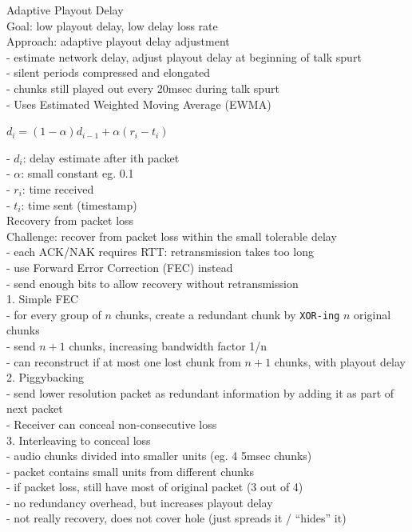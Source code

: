 \documentclass[10pt, a4paper]{article}
\newcommand{\blue}[1]{{\color{MidnightBlue}#1}}
\newcommand{\red}[1]{{\color{red}#1}}
\newcommand{\green}[1]{{\color{ForestGreen}#1}}
\newcommand{\tab}[0]{\hspace*{2mm}}
\begin{document}
\begin{multicols*}{3}
		Adaptive Playout Delay\\
		\red{Goal}: low playout delay, low delay loss rate\\
		\green{Approach}: adaptive playout delay adjustment\\
		\tab - estimate network delay, adjust playout delay at beginning of talk spurt\\
		\tab - silent periods compressed and elongated\\
		\tab - chunks still played out every 20msec during talk spurt\\
		- Uses Estimated Weighted Moving Average (EWMA)\\
		\centerline{$d_{i} = (1-\alpha)d_{i - 1} + \alpha(r_{i} - t_{i})$}
		- $d_{i}$: delay estimate after ith packet\\
		- $\alpha$: small constant eg. 0.1\\
		- $r_{i}$: time received\\
		- $t_{i}$: time sent (timestamp)\\

		Recovery from packet loss\\
		\red{Challenge}: recover from packet loss within the \red{small tolerable delay}\\
		- each ACK/NAK requires RTT: retransmission takes too long\\
		- use Forward Error Correction (FEC) instead\\
		\tab - send enough bits to allow recovery without retransmission\\

		1. Simple FEC\\
		- for every group of $n$ chunks, create a redundant chunk by \texttt{XOR-ing} $n$ original chunks\\
		- send $n+1$ chunks, increasing bandwidth factor 1/n\\
		- can reconstruct if at most one lost chunk from $n+1$ chunks, with playout delay\\

		2. Piggybacking\\
		- send lower resolution packet as redundant information by adding it as part of next packet\\
		- Receiver can conceal \blue{non-consecutive loss}\\

		3. Interleaving to conceal loss\\
		- audio chunks divided into smaller units (eg. 4 5msec chunks)\\
		- packet contains small units from different chunks\\
		- if packet loss, still have most of original packet (3 out of 4)\\
		- no redundancy overhead, but increases playout delay\\
		- not really recovery, does not cover hole (just spreads it / ``hides'' it)\\


\end{multicols*}
\end{document}
